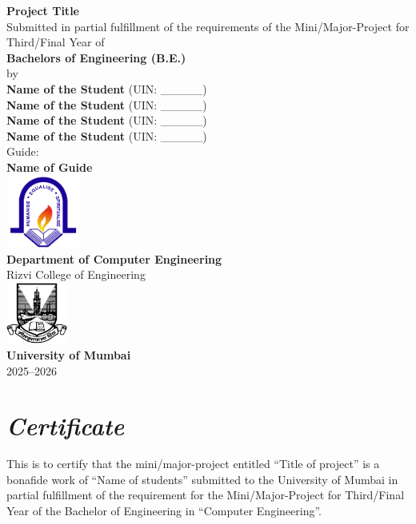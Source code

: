 \documentclass[12pt,a4paper]{report}
\begin{document}
	
	\begin{titlepage}
		\centering
		\vspace*{0.2cm}
		\Huge \textbf{Project Title} \\[1cm]
		\large  {Submitted in partial fulfillment of the requirements of the Mini/Major-Project for Third/Final Year of} \\[0.5cm]
		\Large \textbf{Bachelors of Engineering (B.E.)} \\[0.5cm]
		\large by \\[0.5cm]
		\large \textbf{Name of the Student } (UIN: \_\_\_\_\_) \\
		\large \textbf{Name of the Student } (UIN: \_\_\_\_\_) \\
		\large \textbf{Name of the Student } (UIN: \_\_\_\_\_) \\
		\large \textbf{Name of the Student } (UIN: \_\_\_\_\_) \\ [1cm]
		 
		
		\large {Guide:} \\ 
		\large \textbf{Name of Guide} \\[1cm]
		
		\includegraphics[width=0.18\textwidth]{images/rcoe-logo.png}\\
		\Large \textbf{ Department of Computer Engineering} \\
		{\LARGE Rizvi College of Engineering} \\[1cm]
		
		\includegraphics[width=0.15\textwidth]{images/mu-logo.png}\\
		\LARGE \textbf{University of Mumbai} \\
		2025--2026 \\
	\end{titlepage}
	
	\chapter*{\centering \textit {Certificate}}
	This is to certify that the mini/major-project entitled “Title of project” is a bonafide work of “Name of students” submitted to the University of Mumbai in partial fulfillment of the requirement for the Mini/Major-Project for Third/Final Year of the Bachelor of Engineering in “Computer Engineering”.
	
\end{document}
